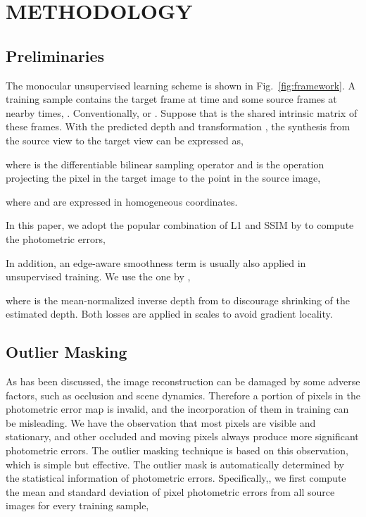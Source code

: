 \documentclass[letterpaper, 10 pt, conference]{ieeeconf}
\begin{document}
\section{METHODOLOGY}
\subsection{Preliminaries}
The monocular unsupervised learning scheme is shown in Fig.~\ref{fig:framework}.
A training sample contains the target frame  at time  and some source frames  at nearby times, . Conventionally,   or . Suppose that  is the shared intrinsic matrix of these frames. With the predicted depth  and transformation , the synthesis from the source view  to the target view  can be expressed as,

where  is the differentiable bilinear sampling operator \cite{jaderberg2015spatial} and  is the operation projecting the pixel  in the target image to the point  in the source image, 

where  and  are expressed in homogeneous coordinates. 

In this paper, we adopt the popular  combination of L1 and SSIM by \cite{godard2017unsupervised} to compute the photometric errors, 


In addition, an edge-aware smoothness term is usually also applied in unsupervised training.  We use the one by \cite{godard2019digging},
 
where  is the mean-normalized inverse depth from \cite{wang2018learning} to discourage shrinking of the estimated depth. Both losses are applied in  scales to avoid gradient locality. 


\subsection{Outlier Masking}
As has been discussed, the image reconstruction can be damaged by some adverse factors, such as occlusion and scene dynamics. Therefore a portion of pixels in the photometric error map is invalid, and the incorporation of them in training can be misleading. 
We have the observation that most pixels are visible and stationary, and other occluded and moving pixels always produce more significant photometric errors. 
The outlier masking technique is based on this observation, which is simple but effective. The outlier mask is automatically determined by the statistical information of photometric errors. 
Specifically,, we first compute the mean and standard deviation of pixel photometric errors from all source images for every training sample, 
\end{document}
